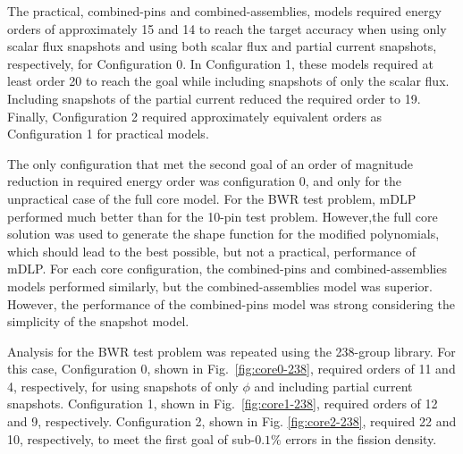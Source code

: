 \documentclass[5p,times,twocolumn,10pt]{elsarticle}
\begin{document}
    The practical, combined-pins and combined-assemblies, models required
    energy orders of approximately 15 and 14 to reach the target accuracy when
using
    only scalar flux snapshots and using both scalar flux and partial
    current snapshots, respectively, for Configuration 0. In Configuration
    1, these models required at
    least order 20 to reach the goal while including snapshots of only the
    scalar flux. Including snapshots of the
    partial current reduced the required order to 19. Finally, Configuration
    2 required approximately equivalent orders as Configuration 1 for
    practical models.

    The only configuration that met the second goal of an order of magnitude
    reduction in required energy order was configuration 0, and
    only for the unpractical case of the full core model. For
    the BWR test problem, mDLP performed much better than for the 10-pin test
    problem. However,the full core solution was used to
    generate the shape function for the modified polynomials, which should lead
    to the best possible, but not a practical, performance of mDLP.
    For each core configuration, the combined-pins and combined-assemblies
    models performed similarly, but the combined-assemblies model was
    superior. However, the performance of the combined-pins model was
    strong considering the simplicity of the snapshot model.

    Analysis for the BWR test problem was repeated using the 238-group
    library. For
    this case, Configuration 0, shown in Fig.~\ref{fig:core0-238}, required
    orders of 11 and 4, respectively, for using snapshots of only $\phi$ and
    including partial
    current snapshots. Configuration 1, shown in Fig.~\ref{fig:core1-238},
    required
    orders of 12 and 9, respectively. Configuration 2, shown in Fig.
    \ref{fig:core2-238}, required 22 and 10, respectively, to meet the first
    goal of sub-$0.1\%$ errors in the fission density.
\end{document}
